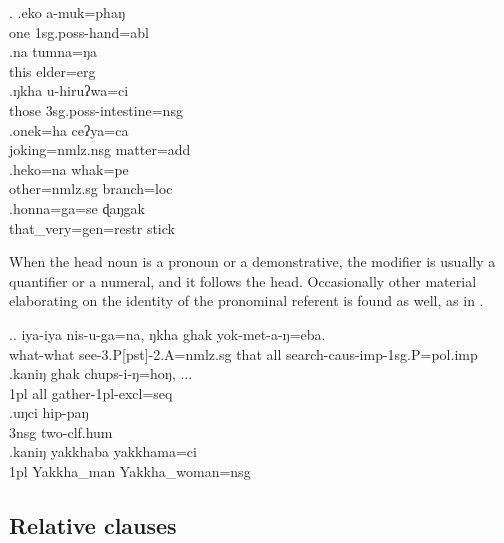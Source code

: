 \ex. \ag.eko a-muk=phaŋ\\
one {\sc 1sg.poss-}hand{\sc =abl}\\
 
\bg.na    tumna=ŋa\\
this elder{\sc =erg}\\
 
\bg.ŋkha u-hiruʔwa=ci\\
those {\sc 3sg.poss-}intestine{\sc =nsg}\\
 
\bg.onek=ha      ceʔya=ca\\
joking{\sc =nmlz.nsg} matter{\sc =add}\\
 
\bg.heko=na         whak=pe\\
other{\sc =nmlz.sg} branch{\sc =loc}\\
 
\bg.honna=ga=se                          ɖaŋgak\\
that\_very{\sc =gen=restr} stick\\
 


When the head noun is a pronoun or  a demonstrative, the modifier is usually a quantifier or a numeral, and it follows the head. Occasionally other material elaborating on the identity of the pronominal referent is found as well, as in \Next[d].

\ex.\label{iyaiyadem}\ag.    iya-iya                nis-u-ga=na, ŋkha ghak yok-met-a-ŋ=eba.\\
what-what see{\sc -3.P[pst]-2.A=nmlz.sg} that all search{\sc -caus-imp-1sg.P=pol.imp}\\
 
\bg.kaniŋ ghak chups-i-ŋ=hoŋ, ...\\
{\sc 1pl} all gather{\sc -1pl-excl=seq}\\
 
\bg.uŋci hip-paŋ\\
{\sc 3nsg} two{\sc -clf.hum}\\
\bg.kaniŋ yakkhaba yakkhama=ci\\
{\sc 1pl} Yakkha\_man Yakkha\_woman{\sc =nsg}\\
              
			  
\subsection{Relative clauses}\label{str-np-rc}

